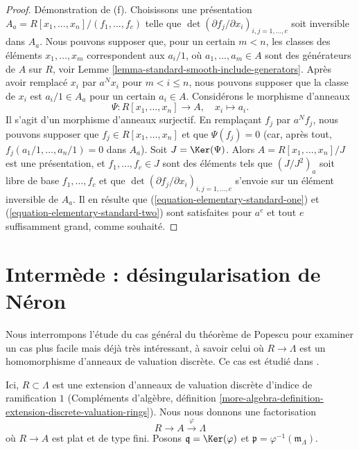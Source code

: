 \begin{proof}
\medskip\noindent
Démonstration de (f). Choisissons une présentation
$A_a = R[x_1, \ldots, x_n]/(f_1, \ldots, f_c)$ telle que
$\det(\partial f_j/\partial x_i)_{i, j = 1, \ldots, c}$
soit inversible dans $A_a$. Nous pouvons supposer que, pour un certain $m < n$,
les classes des éléments $x_1, \ldots, x_m$ correspondent aux $a_i/1$, où
$a_1, \ldots, a_m \in A$ sont des générateurs de $A$ sur $R$, voir
Lemme \ref{lemma-standard-smooth-include-generators}.
Après avoir remplacé $x_i$ par $a^Nx_i$ pour $m < i \leq n$, nous pouvons
supposer que la classe de $x_i$ est $a_i/1 \in A_a$ pour un certain $a_i \in A$.
Considérons le morphisme d'anneaux
$$
\Psi : R[x_1, \ldots, x_n] \longrightarrow A,\quad
x_i \longmapsto a_i.
$$
Il s'agit d'un morphisme d'anneaux surjectif. En remplaçant $f_j$ par $a^Nf_j$,
nous pouvons supposer que $f_j \in R[x_1, \ldots, x_n]$ et que
$\Psi(f_j) = 0$ (car, après tout, $f_j(a_1/1, \ldots, a_n/1) = 0$ dans $A_a$).
Soit $J = \Ker(\Psi)$. Alors $A = R[x_1, \ldots, x_n]/J$ est une présentation,
et $f_1, \ldots, f_c \in J$ sont des éléments tels que $(J/J^2)_a$ soit libre
de base $f_1, \ldots, f_c$ et que
$\det(\partial f_j/\partial x_i)_{i, j = 1, \ldots, c}$ s'envoie sur un élément
inversible de $A_a$. Il en résulte que
(\ref{equation-elementary-standard-one}) et
(\ref{equation-elementary-standard-two})
sont satisfaites pour $a^e$ et tout $e$ suffisamment grand, comme souhaité.
\end{proof}
\section{Intermède : désingularisation de Néron}
\label{section-neron}

\noindent
Nous interrompons l'étude du cas général du théorème de Popescu pour
examiner un cas plus facile mais déjà très intéressant, à savoir celui où
$R \to \Lambda$ est un homomorphisme d'anneaux de valuation discrète.
Ce cas est étudié dans
\cite[section 4]{Artin-Algebraic-Approximation}.

\begin{situation}
\label{situation-neron}
Ici, $R \subset \Lambda$ est une extension d'anneaux de valuation discrète
d'indice de ramification $1$ (Compléments d'algèbre, définition
\ref{more-algebra-definition-extension-discrete-valuation-rings}).
Nous nous donnons une factorisation
$$
R \to A \xrightarrow{\varphi} \Lambda
$$
où $R \to A$ est plat et de type fini. Posons $\mathfrak q = \Ker(\varphi)$
et $\mathfrak p = \varphi^{-1}(\mathfrak m_\Lambda)$.
\end{situation}

